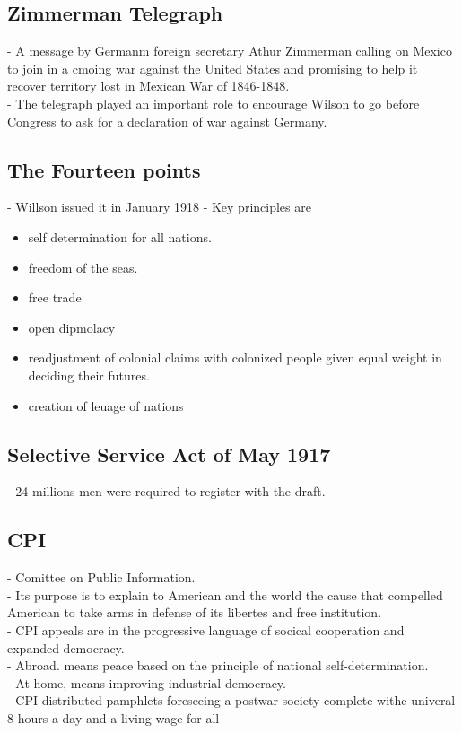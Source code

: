\documentclass{article}
\begin{document}
\subsection{Zimmerman Telegraph}
- A message by Germanm foreign secretary Athur Zimmerman calling on Mexico to join in a cmoing war against the United States and promising to help it recover territory lost in Mexican War of 1846-1848.\\
- The telegraph played an important role to encourage Wilson to go before Congress to ask for a declaration of war against Germany.\\

\subsection{ The Fourteen points}
- Willson issued it in January 1918
- Key principles are 
\begin{itemize}
\item self determination for all nations.
\item freedom of the seas.
\item free trade
\item open dipmolacy
\item readjustment of colonial claims with colonized people given equal weight in deciding their futures.
\item creation of leuage of nations
\end{itemize}

\subsection{ Selective Service Act of May 1917}
- 24 millions men were required to register with the draft.\\

\subsection{CPI}
- Comittee on Public Information.\\
- Its purpose is to explain to American and the world the cause that compelled American to take arms in defense of its libertes and free institution.\\
- CPI appeals are in the progressive language of socical cooperation and expanded democracy.\\
- Abroad. means peace based on the principle of national self-determination.\\
- At home, means improving industrial democracy.\\
- CPI distributed pamphlets foreseeing a postwar society complete withe univeral 8 hours a day and a living wage for all\\
\end{document}
